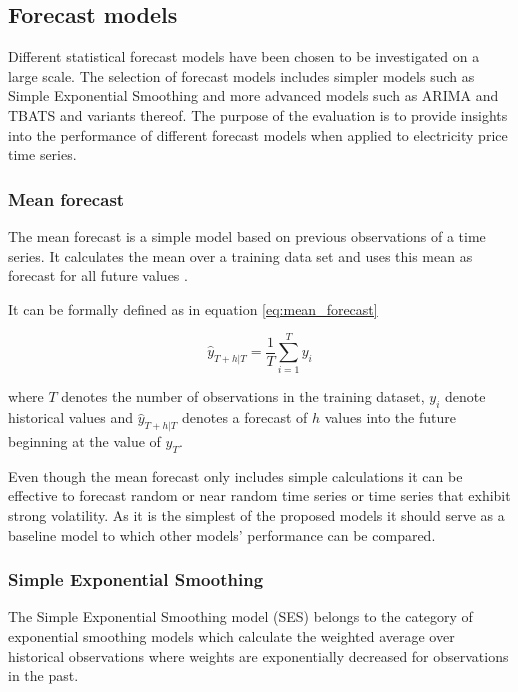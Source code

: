 \subsection{Forecast models}

Different statistical forecast models have been chosen to be investigated on a large scale. The selection of forecast models includes simpler models such as Simple Exponential Smoothing and more advanced models such as ARIMA and TBATS and variants thereof. The purpose of the evaluation is to provide insights into the performance of different forecast models when applied to electricity price time series. 

\subsubsection{Mean forecast}

The mean forecast is a simple model based on previous observations of a time series. It calculates the mean over a training data set and uses this mean as forecast for all future values \cite{hyndman2012forecasting}. 

It can be formally defined as in equation \ref{eq:mean_forecast}


\begin{equation}
\hat{y}_{T+h|T} = \frac{1}{T} \sum_{i=1}^T y_i
\label{eq:mean_forecast}
\end{equation}

where $T$ denotes the number of observations in the training dataset, $y_i$ denote historical values and $\hat{y}_{T+h|T}$ denotes a forecast of $h$ values into the future beginning at the value of $y_T$. 

Even though the mean forecast only includes simple calculations it can be effective to forecast random or near random time series or time series that exhibit strong volatility. As it is the simplest of the proposed models it should serve as a baseline model to which other models' performance can be compared. 

\subsubsection{Simple Exponential Smoothing}

The Simple Exponential Smoothing model (SES) belongs to the category of exponential smoothing models which calculate the weighted average over historical observations where weights are exponentially decreased for observations in the past. 

